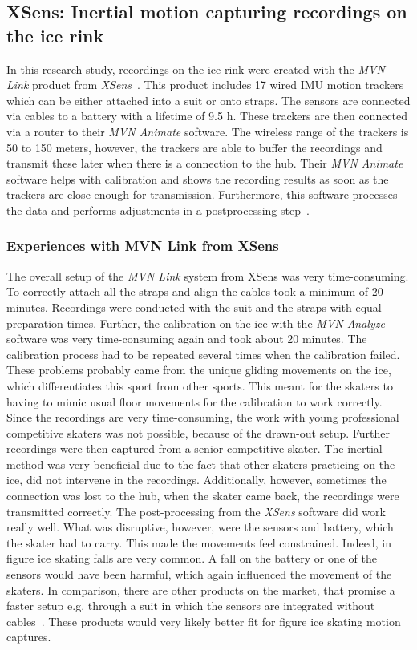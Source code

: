 \subsection{XSens: Inertial motion capturing recordings on the ice rink}
In this research study, recordings on the ice rink were created with the \textit{MVN Link} product from \textit{XSens}~\cite{xsensmvnanimate}.
This product includes 17 wired \gls{IMU} motion trackers which can be either attached into a suit or onto straps.
The sensors are connected via cables to a battery with a lifetime of 9.5 h.
These trackers are then connected via a router to their \textit{MVN Animate} software.
The wireless range of the trackers is 50 to 150 meters, however, the trackers are able to buffer the recordings
and transmit these later when there is a connection to the hub.
Their \textit{MVN Animate} software helps with calibration and shows the recording results as soon as the trackers are close
enough
for transmission.
Furthermore, this software processes the data and performs adjustments in a postprocessing step~\cite{xsensmvnanimate}.



\subsubsection*{Experiences with MVN Link from XSens}
The overall setup of the \textit{MVN Link} system from {XSens} was very time-consuming.
To correctly attach all the straps and align the cables took a
minimum of 20 minutes.
Recordings were conducted with the suit and the straps with equal preparation times.
Further, the calibration on the ice with the \textit{MVN Analyze} software was very time-consuming again and took
about 20 minutes.
The calibration process had to be repeated several times when the calibration failed.
These problems probably came from the unique gliding movements on the ice, which differentiates this sport from other
sports.
This meant for the skaters to having to mimic usual floor movements for the calibration to work correctly.
Since the recordings are very time-consuming, the work with young professional competitive skaters was not possible,
because
of the drawn-out setup.
Further recordings were then captured from a senior competitive skater.
The inertial method was very beneficial due to the fact that other
skaters practicing on the ice, did not intervene in the recordings.
Additionally, however, sometimes the connection was lost to
the hub, when the skater came back, the recordings were transmitted correctly.
The post-processing from the \textit{XSens} software did work really well.
What was disruptive, however, were the sensors and battery, which the skater had to carry.
This made the movements feel constrained. Indeed, in figure ice skating falls are very common.
A fall on the battery or one of the sensors would have been harmful, which again influenced the movement of the
skaters.
In comparison, there are other products on the market, that promise a faster setup e.g. through a suit in which the
sensors
are integrated without cables~\cite{mocapinterialneuron}. These products would very likely better fit for figure ice
skating
motion captures.



